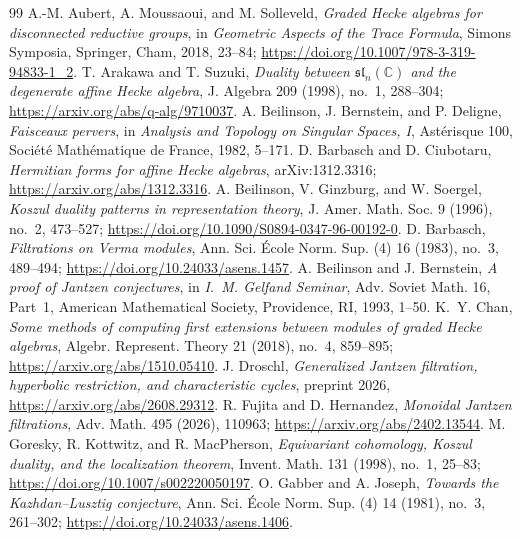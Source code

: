 \documentclass[10pt,a4paper]{amsart}
\begin{document}
\begin{thebibliography}{99}
 A.-M. Aubert, A. Moussaoui, and M. Solleveld, \emph{Graded Hecke algebras for disconnected reductive groups}, in \emph{Geometric Aspects of the Trace Formula}, Simons Symposia, Springer, Cham, 2018, 23--84; \url{https://doi.org/10.1007/978-3-319-94833-1_2}.
 T. Arakawa and T. Suzuki, \emph{Duality between $\mathfrak{sl}_n(\mathbb C)$ and the degenerate affine Hecke algebra}, J. Algebra 209 (1998), no.~1, 288--304; \url{https://arxiv.org/abs/q-alg/9710037}.
 A. Beilinson, J. Bernstein, and P. Deligne, \emph{Faisceaux pervers}, in \emph{Analysis and Topology on Singular Spaces, I}, Ast\'erisque 100, Soci\'et\'e Math\'ematique de France, 1982, 5--171.
 D. Barbasch and D. Ciubotaru, \emph{Hermitian forms for affine Hecke algebras}, arXiv:1312.3316; \url{https://arxiv.org/abs/1312.3316}.
 A. Beilinson, V. Ginzburg, and W. Soergel, \emph{Koszul duality patterns in representation theory}, J. Amer. Math. Soc. 9 (1996), no.~2, 473--527; \url{https://doi.org/10.1090/S0894-0347-96-00192-0}.
 D. Barbasch, \emph{Filtrations on Verma modules}, Ann. Sci. \'{E}cole Norm. Sup. (4) 16 (1983), no.~3, 489--494; \url{https://doi.org/10.24033/asens.1457}.
 A. Beilinson and J. Bernstein, \emph{A proof of Jantzen conjectures}, in \emph{I.~M. Gelfand Seminar}, Adv. Soviet Math. 16, Part~1, American Mathematical Society, Providence, RI, 1993, 1--50.
 K.~Y. Chan, \emph{Some methods of computing first extensions between modules of graded Hecke algebras}, Algebr. Represent. Theory 21 (2018), no.~4, 859--895; \url{https://arxiv.org/abs/1510.05410}.
 J. Droschl, \emph{Generalized Jantzen filtration, hyperbolic restriction, and characteristic cycles}, preprint 2026, \url{https://arxiv.org/abs/2608.29312}.
 R. Fujita and D. Hernandez, \emph{Monoidal Jantzen filtrations}, Adv. Math. 495 (2026), 110963; \url{https://arxiv.org/abs/2402.13544}.
 M. Goresky, R. Kottwitz, and R. MacPherson, \emph{Equivariant cohomology, Koszul duality, and the localization theorem}, Invent. Math. 131 (1998), no.~1, 25--83; \url{https://doi.org/10.1007/s002220050197}.
 O. Gabber and A. Joseph, \emph{Towards the Kazhdan--Lusztig conjecture}, Ann. Sci. \'{E}cole Norm. Sup. (4) 14 (1981), no.~3, 261--302; \url{https://doi.org/10.24033/asens.1406}.

\end{thebibliography}
\end{document}
